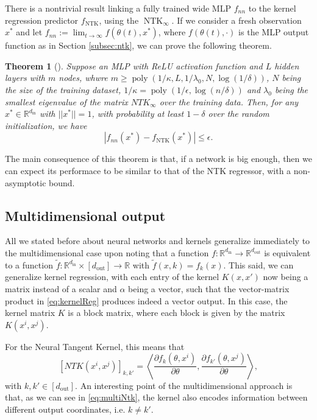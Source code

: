 \documentclass[11pt,notitlepage]{article}
\numberwithin{equation}{section}
\def\R{{\mathbb{R}}}
\DeclareMathOperator{\NTK}{NTK}
\DeclareMathOperator{\poly}{poly}
\newtheorem{theorem}{Theorem}[section]
\theoremstyle{remark}
\theoremstyle{definition}
\begin{document}
	There is a nontrivial result linking a fully trained wide MLP $f_{nn}$ to the kernel regression predictor $f_{\NTK}$, using the $\NTK_\infty$.
	If we consider a fresh observation $x^*$ and let $f_{nn} := \lim_{t \rightarrow \infty} f(\theta(t), x^*)$, where $f(\theta(t), \cdot)$ is the MLP output function as in Section \ref{subsec:ntk}, we can prove the following theorem.
	\begin{theorem}[\cite{arora2019exact}]
		Suppose an MLP with ReLU activation function and $L$ hidden layers with $m$ nodes, whwre $m \geq \poly(1/\kappa, L, 1/\lambda_0, N, \log(1/\delta))$, $N$ being the size of the training dataset, $1/\kappa = \poly(1/\epsilon, \log(n/\delta))$ and $\lambda_0$ being the smallest eigenvalue of the matrix $NTK_\infty$ over the training data.
		Then, for any $x^* \in \R^{d_\text{in}}$ with $||x^*|| = 1$, with probability at least $1-\delta$ over the random initialization, we have 
		\[|f_{nn}(x^*) - f_{\NTK}(x^*)| \leq \epsilon. \]
	\end{theorem}
    The main consequence of this theorem is that, if a network is big enough, then we can expect its performace to be similar to that of the NTK regressor, with a non-asymptotic bound.
	
	\subsection{Multidimensional output}
	
	All we stated before about neural networks and kernels generalize immediately to the multi\-dimensional case upon noting that a function $f : \R^{d_\text{in}} \rightarrow \R^{d_\text{out}}$ is equivalent to a function $\tilde{f} : \R^{d_\text{in}} \times [d_\text{out}] \rightarrow \R$ with $\tilde{f}(x, k) = f_k(x)$.
	This said, we can generalize kernel regression, with each entry of the kernel $K(x, x')$ now being a matrix instead of a scalar and $\alpha$ being a vector, such that the vector-matrix product in \eqref{eq:kernelReg} produces indeed a vector output.
	In this case, the kernel matrix $K$ is a block matrix, where each block is given by the matrix $K(x^i, x^j)$.
	
	For the Neural Tangent Kernel, this means that 
	\begin{equation}\label{eq:multiNtk}
	[NTK(x^i,x^j)]_{k, k'} = \left\langle \frac{\partial f_k (\theta, x^i)}{\partial \theta}, \frac{\partial f_{k'} (\theta, x^j)}{\partial \theta} \right\rangle,
	\end{equation}
	with $k,k' \in [d_\text{out}]$.
	An interesting point of the multidimensional approach is that, as we can see in \eqref{eq:multiNtk}, the kernel also encodes information between different output coordinates, i.e. $k \neq k'$.
	
\end{document}
